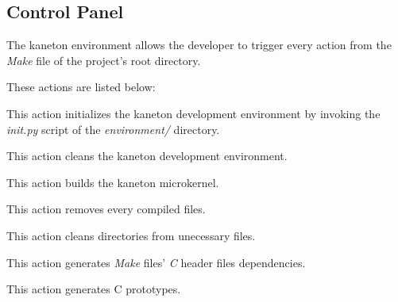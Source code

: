 %
%
%
%
%
%

%
%

\subsection{Control Panel}
\label{section:control panel}

The kaneton environment allows the developer to trigger every action from
the \textit{Make} file of the project's root directory.

These actions are listed below:

        {
	  This action initializes the kaneton development environment by
	  invoking the \textit{init.py} script of the \textit{environment/}
	  directory.

	  \-

	}

	{
	  This action cleans the kaneton development environment.

	  \-

	}

	{
	  This action builds the kaneton microkernel.

	  \-

	}

	{
	  This action removes every compiled files.

	  \-

	}

	{
	  This action cleans directories from unecessary files.

	  \-

	}

	{
	  This action generates \textit{Make} files' \textit{C} header
	  files dependencies.

	  \-

	}

	{
	  This action generates C prototypes.

	  \-

	}

